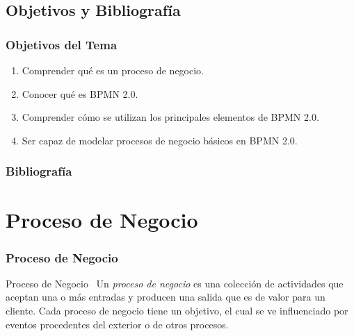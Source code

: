 \documentclass[a4paper,slidestop,xcolor=pst,blue]{beamer}
\begin{document}
\subsection{Objetivos y Bibliografía}

\begin{frame}[c]
    \frametitle{Objetivos del Tema}
    \begin{enumerate}[<+->]
         \item Comprender qué es un proceso de negocio.
         \item Conocer qué es BPMN 2.0.
         \item Comprender cómo se utilizan los principales elementos de BPMN 2.0.
         \item Ser capaz de modelar procesos de negocio básicos en BPMN 2.0.
    \end{enumerate}
\end{frame}

\begin{frame}[c]
    \frametitle{Bibliografía}
    \begin{thebibliography}{1}



    \end{thebibliography}
\end{frame}

\section{Proceso de Negocio}

\begin{frame}[c]
    \frametitle{Proceso de Negocio}
    \begin{block}{Proceso de Negocio~\cite{}}
        Un \emph{proceso de negocio} es una colección de actividades que aceptan una o más entradas y producen una salida que es de valor para un cliente. Cada proceso de negocio tiene un objetivo, el cual se ve influenciado por eventos procedentes del exterior o de otros procesos.
    \end{block}
\end{frame}
\end{document}
